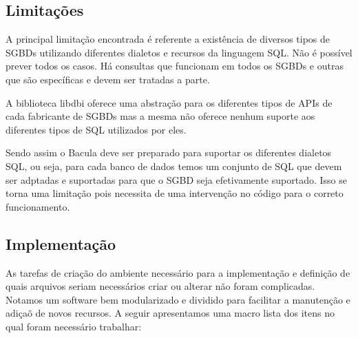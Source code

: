 \subsection{Limitações}

A principal limitação encontrada é referente a existência de diversos tipos de SGBDs utilizando diferentes dialetos e recursos da linguagem SQL. Não é possível prever todos os casos. Há consultas que funcionam em todos os SGBDs e outras que são específicas e devem ser tratadas a parte. 

A biblioteca libdbi oferece uma abstração para os diferentes tipos de APIs de cada fabricante de SGBDs mas a mesma não oferece nenhum suporte aos diferentes tipos de SQL utilizados por eles.

Sendo assim o Bacula deve ser preparado para suportar os diferentes dialetos SQL, ou seja, para cada banco de dados temos um conjunto de SQL que devem ser adptadas e suportadas para que o SGBD seja efetivamente suportado. Isso se torna uma limitação pois necessita de uma intervenção no código para o correto funcionamento.

\subsection{Implementação}

As tarefas de criação do ambiente necessário para a implementação e definição de quais arquivos seriam necessários criar ou alterar não foram complicadas. Notamos um software bem modularizado e dividido para facilitar a manutenção e adiçaõ de novos recursos. A seguir apresentamos uma macro lista dos itens no qual foram necessário trabalhar:

